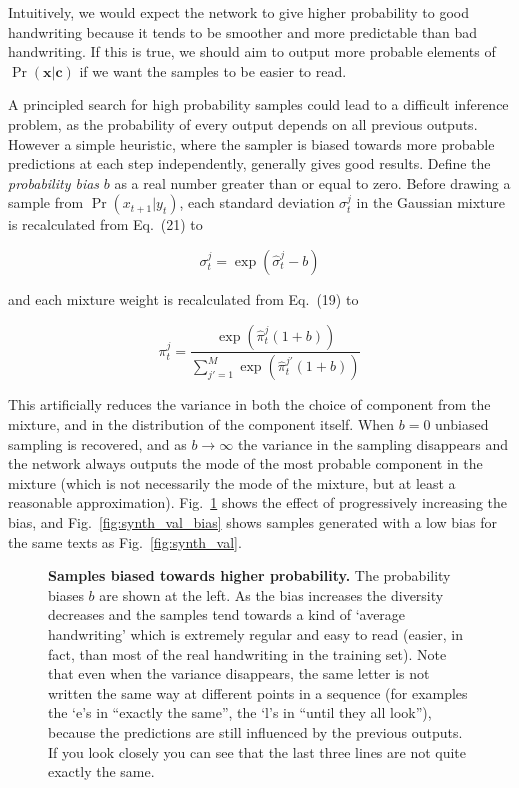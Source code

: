 Intuitively, we would expect the network to give higher probability to good handwriting because it tends to be smoother and more predictable than bad handwriting. If this is true, we should aim to output more probable elements of $\Pr(\mathbf{x}|\mathbf{c})$ if we want the samples to be easier to read. 

A principled search for high probability samples could lead to a difficult inference problem, as the probability of every output depends on all previous outputs. However a simple heuristic, where the sampler is biased towards more probable predictions at each step independently, generally gives good results. Define the \emph{probability bias} $b$ as a real number greater than or equal to zero. Before drawing a sample from $\Pr(x_{t+1}|y_t)$, each standard deviation $\sigma^j_t$ in the Gaussian mixture is recalculated from Eq.~(21) to

\begin{equation}
\sigma^j_t = \exp\left(\hat{\sigma}^j_t - b\right)
\end{equation}

and each mixture weight is recalculated from Eq.~(19) to

\begin{equation}
\pi^j_t = \frac{\exp\left(\hat{\pi}^j_t(1+b)\right)}{\sum_{j'=1}^M{\exp\left(\hat{\pi}^{j'}_t(1+b)\right)}}
\end{equation}

This artificially reduces the variance in both the choice of component from the mixture, and in the distribution of the component itself. When $b=0$ unbiased sampling is recovered, and as $b \rightarrow \infty$ the variance in the sampling disappears and the network always outputs the mode of the most probable component in the mixture (which is not necessarily the mode of the mixture, but at least a reasonable approximation).
Fig.~\ref{fig:synth_biased} shows the effect of progressively increasing the bias, and Fig.~\ref{fig:synth_val_bias} shows samples generated with a low bias for the same texts as Fig.~\ref{fig:synth_val}.

\begin{figure}
\begin{center}

\end{center}
\caption[Samples biased towards higher probability.]{\textbf{Samples biased towards higher probability.} The probability biases $b$ are shown at the left. As the bias increases the diversity decreases and the samples tend towards a kind of `average handwriting' which is extremely regular and easy to read (easier, in fact, than most of the real handwriting in the training set).
Note that even when the variance disappears, the same letter is not written the same way at different points in a sequence (for examples the `e's in ``exactly the same'', the `l's in ``until they all look''), because the predictions are still influenced by the previous outputs.
If you look closely you can see that the last three lines are not quite exactly the same.}
\label{fig:synth_biased}
\end{figure}

